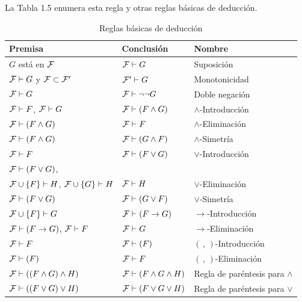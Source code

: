 \message{ !name(main.tex)}\documentclass[12pt,a4paper]{book}
\begin{document}
    La Tabla 1.5 enumera esta regla y otras reglas básicas de deducción.

    \begin{table}[htbp]
        \centering
        \small
        \caption{Reglas básicas de deducción}
        \renewcommand{\arraystretch}{1.5}
        \setlength{\tabcolsep}{8pt}
        \begin{tabular}{l l l}
            Premisa & Conclusión & Nombre\\
            \hline
            $G$ está en $\mathcal{F}$ & $\mathcal{F}\vdash G$ & Suposición\\
            $\mathcal{F}\vdash G$ y $\mathcal{F}\subset\mathcal{F}'$ & $\mathcal{F}'\vdash G$ & Monotonicidad\\
            $\mathcal{F}\vdash G$ & $\mathcal{F}\vdash\neg\neg G$ & Doble negación\\
            $\mathcal{F}\vdash F$, $\mathcal{F}\vdash G$ & $\mathcal{F}\vdash(F\wedge G)$ & $\wedge$-Introducción\\
            $\mathcal{F}\vdash(F\wedge G)$ & $\mathcal{F}\vdash F$ & $\wedge$-Eliminación\\
            $\mathcal{F}\vdash(F\wedge G)$ & $\mathcal{F}\vdash(G\wedge F)$ & $\wedge$-Simetría\\
            $\mathcal{F}\vdash F$ & $\mathcal{F}\vdash(F\vee G)$ & $\vee$-Introducción\\
            $\mathcal{F}\vdash(F\vee G)$, & & \\
            $\mathcal{F}\cup\{F\}\vdash H$, $\mathcal{F}\cup\{G\}\vdash H$ & $\mathcal{F}\vdash H$ & $\vee$-Eliminación\\
            $\mathcal{F}\vdash(F\vee G)$ & $\mathcal{F}\vdash(G\vee F)$ & $\vee$-Simetría\\
            $\mathcal{F}\cup\{F\}\vdash G$ & $\mathcal{F}\vdash(F\rightarrow G)$ & $\rightarrow$-Introducción\\
            $\mathcal{F}\vdash(F\rightarrow G)$, $\mathcal{F}\vdash F$ & $\mathcal{F}\vdash G$ & $\rightarrow$-Eliminación\\
            $\mathcal{F}\vdash F$ & $\mathcal{F}\vdash(F)$ & $(\,,\,)$-Introducción\\
            $\mathcal{F}\vdash(F)$ & $\mathcal{F}\vdash F$ & $(\,,\,)$-Eliminación\\
            $\mathcal{F}\vdash((F\wedge G)\wedge H)$ & $\mathcal{F}\vdash(F\wedge G\wedge H)$ & Regla de paréntesis para $\wedge$\\
            $\mathcal{F}\vdash((F\vee G)\vee H)$ & $\mathcal{F}\vdash(F\vee G\vee H)$ & Regla de paréntesis para $\vee$\\
        \end{tabular}
    \end{table}
\end{document}
